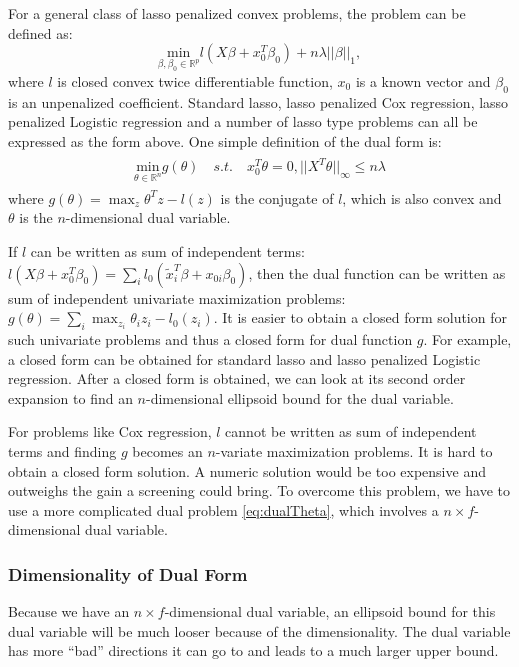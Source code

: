 For a general class of lasso penalized convex problems, the problem can be defined as:
\begin{equation}
    \underset{\beta,\beta_0\in \mathbb{R}^p}{\mathrm{min}}l(X\beta+x_0^T\beta_0)+n\lambda||\beta||_1,
\end{equation}
where $l$ is closed convex twice differentiable function, $x_0$ is a known vector and $\beta_0$ is an unpenalized coefficient. Standard lasso, lasso penalized Cox regression, lasso penalized Logistic regression and a number of lasso type problems can all be expressed as the form above. One simple definition of the dual form is:
\begin{gather}
    \begin{aligned}
         \underset{\theta\in \mathbb{R}^n}{\mathrm{min}} g(\theta)\quad s.t.\quad x_0^T\theta=0,||X^T\theta||_\infty\leq n\lambda
    \end{aligned}
\end{gather}
where $g(\theta)=\max_z \theta^Tz-l(z)$ is the conjugate of $l$, which is also convex and $\theta$ is the $n$-dimensional dual variable.

If $l$ can be written as sum of independent terms: $l(X\beta+x_0^T\beta_0)=\sum_i l_0(\tilde{x}_i^T\beta+x_{0i}\beta_0)$, then the dual function can be written as sum of independent univariate maximization problems: $g(\theta)=\sum_i\max_{z_i} \theta_iz_i-l_0(z_i)$. It is easier to obtain a closed form solution for such univariate problems and thus a closed form for dual function $g$. For example, a closed form can be obtained for standard lasso and lasso penalized Logistic regression. After a closed form is obtained, we can look at its second order expansion to find an $n$-dimensional ellipsoid bound for the dual variable.

For problems like Cox regression, $l$ cannot be written as sum of independent terms and finding $g$ becomes an $n$-variate maximization problems. It is hard to obtain a closed form solution. A numeric solution would be too expensive and outweighs the gain a screening could bring. To overcome this problem, we have to use a more complicated dual problem \eqref{eq:dualTheta}, which involves a $n\times f$-dimensional dual variable. 

\subsubsection{Dimensionality of Dual Form}

Because we have an $n\times f$-dimensional dual variable, an ellipsoid bound for this dual variable will be much looser because of the dimensionality. The dual variable has more ``bad'' directions it can go to and leads to a much larger upper bound.

